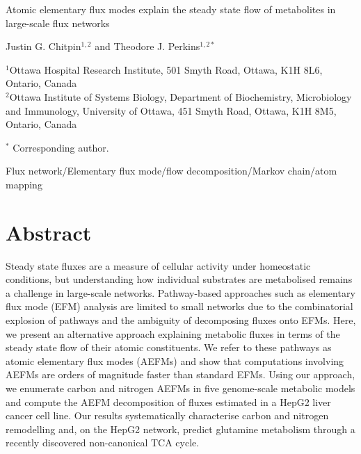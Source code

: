 \documentclass[12pt]{article}
\begin{document}
\begin{titlepage}
    \begin{center}
        \vspace*{1cm}

        {\Large Atomic elementary flux modes explain the steady state flow of
        metabolites in large-scale flux networks}

            
        \vspace{1.0cm}

        Justin G. Chitpin$^{1,2}$ and Theodore J. Perkins$^{1,2*}$

        \vspace{1.0cm}

        $^1$Ottawa Hospital Research Institute, 501 Smyth Road, Ottawa, K1H 8L6, Ontario, Canada\\
        $^2$Ottawa Institute of Systems Biology, Department of Biochemistry, Microbiology and Immunology, University of Ottawa, 451 Smyth Road, Ottawa, K1H 8M5, Ontario, Canada
           
        \vspace{0.5cm}

        $^*$ Corresponding author.

        \vspace{1.0cm}
     
        Flux network/Elementary flux mode/flow decomposition/Markov chain/atom mapping
            
   \end{center}
\end{titlepage}

\clearpage

\section*{Abstract} %

Steady state fluxes are a measure of cellular activity under homeostatic
conditions, but understanding how individual substrates are metabolised
remains a challenge in large-scale networks. Pathway-based approaches such
as elementary flux mode (EFM) analysis are limited to small networks due
to the combinatorial explosion of pathways and the ambiguity of
decomposing fluxes onto EFMs. Here, we present an alternative approach
explaining metabolic fluxes in terms of the steady state flow of their
atomic constituents. We refer to these pathways as atomic elementary flux
modes (AEFMs) and show that computations involving AEFMs are orders of
magnitude faster than standard EFMs. Using our approach, we enumerate
carbon and nitrogen AEFMs in five genome-scale metabolic models and
compute the AEFM decomposition of fluxes estimated in a HepG2 liver cancer
cell line. Our results systematically characterise carbon and nitrogen
remodelling and, on the HepG2 network, predict glutamine metabolism
through a recently discovered non-canonical TCA cycle.
\end{document}

